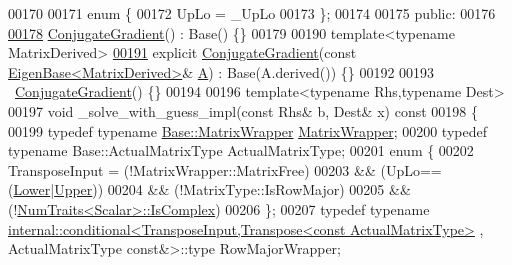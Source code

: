 \begin{DoxyCode}
00170 
00171   \textcolor{keyword}{enum} \{
00172     UpLo = \_UpLo
00173   \};
00174 
00175 \textcolor{keyword}{public}:
00176 
\hyperlink{group___iterative_linear_solvers___module_a92a9656ca9fa4da240194f89229255eb}{00178}   \hyperlink{group___iterative_linear_solvers___module_a92a9656ca9fa4da240194f89229255eb}{ConjugateGradient}() : Base() \{\}
00179 
00190   \textcolor{keyword}{template}<\textcolor{keyword}{typename} MatrixDerived>
\hyperlink{group___iterative_linear_solvers___module_ac10f778fcd137eca1f6057c8ddd3d644}{00191}   \textcolor{keyword}{explicit} \hyperlink{group___iterative_linear_solvers___module_ac10f778fcd137eca1f6057c8ddd3d644}{ConjugateGradient}(\textcolor{keyword}{const} \hyperlink{group___core___module_struct_eigen_1_1_eigen_base}{EigenBase<MatrixDerived>}& 
      \hyperlink{group___core___module_class_eigen_1_1_matrix}{A}) : Base(A.derived()) \{\}
00192 
00193   ~\hyperlink{group___iterative_linear_solvers___module_class_eigen_1_1_conjugate_gradient}{ConjugateGradient}() \{\}
00194 
00196   \textcolor{keyword}{template}<\textcolor{keyword}{typename} Rhs,\textcolor{keyword}{typename} Dest>
00197   \textcolor{keywordtype}{void} \_solve\_with\_guess\_impl(\textcolor{keyword}{const} Rhs& b, Dest& x)\textcolor{keyword}{ const}
00198 \textcolor{keyword}{  }\{
00199     \textcolor{keyword}{typedef} \textcolor{keyword}{typename} \hyperlink{class_eigen_1_1internal_1_1generic__matrix__wrapper}{Base::MatrixWrapper} \hyperlink{class_eigen_1_1internal_1_1generic__matrix__wrapper}{MatrixWrapper};
00200     \textcolor{keyword}{typedef} \textcolor{keyword}{typename} Base::ActualMatrixType ActualMatrixType;
00201     \textcolor{keyword}{enum} \{
00202       TransposeInput  =   (!MatrixWrapper::MatrixFree)
00203                       &&  (UpLo==(\hyperlink{group__enums_gga39e3366ff5554d731e7dc8bb642f83cda891792b8ed394f7607ab16dd716f60e6}{Lower}|\hyperlink{group__enums_gga39e3366ff5554d731e7dc8bb642f83cda6bcb58be3b8b8ec84859ce0c5ac0aaec}{Upper}))
00204                       &&  (!MatrixType::IsRowMajor)
00205                       &&  (!\hyperlink{group___core___module_struct_eigen_1_1_num_traits}{NumTraits<Scalar>::IsComplex})
00206     \};
00207     \textcolor{keyword}{typedef} \textcolor{keyword}{typename} 
      \hyperlink{struct_eigen_1_1internal_1_1conditional}{internal::conditional<TransposeInput,Transpose<const ActualMatrixType>}
      , ActualMatrixType \textcolor{keyword}{const}&>::type RowMajorWrapper;

\end{DoxyCode}
